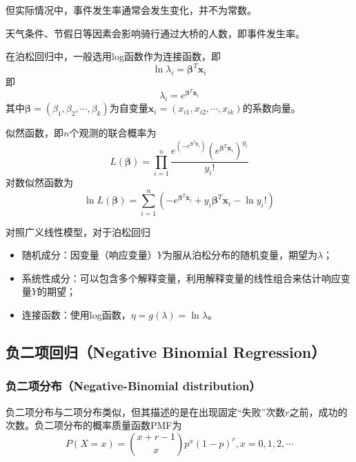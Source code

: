 但实际情况中，事件发生率通常会发生变化，并不为常数。
\begin{example}
    天气条件、节假日等因素会影响骑行通过大桥的人数，即事件发生率。
\end{example}

在泊松回归中，一般选用log函数作为连接函数，即
\begin{equation}
    \ln \lambda_i =\bm{\beta}^T \mathbf{x}_i
\end{equation}
即
\begin{equation}
    \lambda_i = e^{\bm{\beta}^T \mathbf{x}_i}
\end{equation}
其中$\bm{\beta}= (\beta_1,\beta_2,\cdots,\beta_k)$为自变量$\mathbf{x}_i= (x_{i1},x_{i2},\cdots,x_{ik})$的系数向量。

似然函数，即$n$个观测的联合概率为
\begin{equation}
    L(\bm{\beta}) = \prod_{i=1}^n \frac{e^{(-e^{\bm{\beta}^T \mathbf{x}_i})}(e^{\bm{\beta}^T \mathbf{x}_i })^{y_i}}{y_i!}
\end{equation}
对数似然函数为
\begin{equation}
    \ln L(\bm{\beta}) = \sum_{i=1}^n \left(-e^{\bm{\beta}^T \mathbf{x}_i} + y_i \bm{\beta}^T \mathbf{x}_i - \ln y_i!\right)
\end{equation}

对照广义线性模型，对于泊松回归
\begin{itemize}[itemsep=0pt,parsep=0pt]
    \item 随机成分：因变量（响应变量）$Y$为服从泊松分布的随机变量，期望为$\lambda$；
    \item 系统性成分：可以包含多个解释变量，利用解释变量的线性组合来估计响应变量$Y$的期望；
    \item 连接函数：使用log函数，$\eta = g(\lambda) = \ln \lambda$。
\end{itemize}

\subsection{负二项回归（Negative Binomial Regression）}

\subsubsection{负二项分布（Negative-Binomial distribution）}

负二项分布与二项分布类似，但其描述的是在出现固定“失败”次数$r$之前，成功的次数。负二项分布的概率质量函数PMF为
\begin{equation}
    P(X=x) = \binom{x+r-1}{x}p^x(1-p)^r, x=0,1,2,\cdots
\end{equation}

